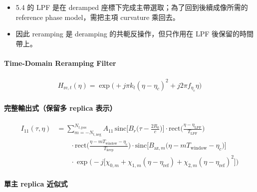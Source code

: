 \documentclass[10pt]{article}
\providecommand{\tightlist}{%
  \setlength{\itemsep}{0pt}\setlength{\parskip}{0pt}}
\begin{document}
\begin{itemize}
\tightlist
\item
  5.4 的 LPF 是在 deramped 座標下完成主帶選取；為了回到後續成像所需的
  reference phase model，需把主項 curvature 乘回去。
\item
  因此 reramping 是 deramping 的共軛反操作，但只作用在 LPF
  後保留的時間帶上。
\end{itemize}

\hypertarget{time-domain-reramping-filter}{%
\paragraph{Time-Domain Reramping
Filter}\label{time-domain-reramping-filter}}

\begin{equation}
\begin{aligned}
H_{\mathrm{re},t}(\eta) = \exp\biggl( +j\pi k_t(\eta-\eta_c)^2 + j2\pi f_{\eta_c}\eta \biggr)
\end{aligned}
\end{equation}

\hypertarget{ux5b8cux6574ux8f38ux51faux5f0fux4fddux7559ux591a-replica-ux8868ux793a-1}{%
\paragraph{完整輸出式（保留多 replica
表示）}\label{ux5b8cux6574ux8f38ux51faux5f0fux4fddux7559ux591a-replica-ux8868ux793a-1}}

\begin{equation}
\begin{aligned}
I_{11}(\tau,\eta)
&=
\sum_{m=-N_{t,\mathrm{neg}}}^{N_{t,\mathrm{pos}}} A_{11}\,
\mathrm{sinc}\biggl[ B_r\biggl( \tau-\frac{2R_0}{c} \biggr) \biggr]
\cdot \mathrm{rect}\biggl( \frac{\eta-\eta_{\mathrm{LPF}}}{T_{\mathrm{LPF}}} \biggr)\\
&\qquad \cdot \mathrm{rect}\biggl( \frac{\eta-mT_{\mathrm{window}}-\eta_c}{T_{\mathrm{keep}}} \biggr)
\cdot \mathrm{sinc}\biggl[ B_{\mathrm{az},m}\biggl( \eta-mT_{\mathrm{window}}-\eta_c \biggr) \biggr]\\
&\qquad \cdot \exp\biggl( -j\biggl[ \chi_{0,m}+\chi_{1,m}(\eta-\eta_{\mathrm{ref}})+\chi_{2,m}(\eta-\eta_{\mathrm{ref}})^2 \biggr] \biggr)
\end{aligned}
\end{equation}

\hypertarget{ux55aeux4e3b-replica-ux8fd1ux4f3cux5f0f-1}{%
\paragraph{單主 replica
近似式}\label{ux55aeux4e3b-replica-ux8fd1ux4f3cux5f0f-1}}
\end{document}
